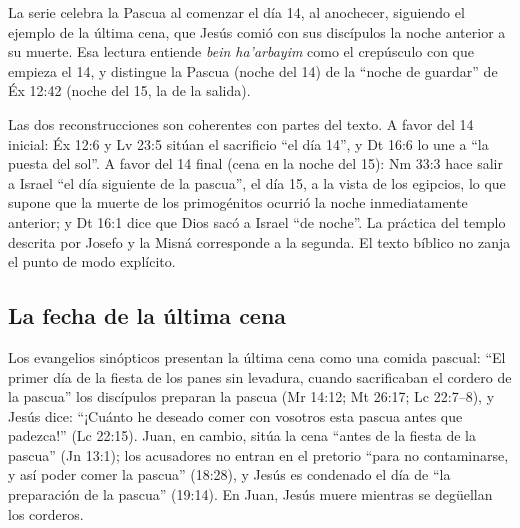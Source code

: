\documentclass[11pt,letterpaper]{article}
\begin{document}
La serie celebra la Pascua al comenzar el día 14, al anochecer, siguiendo el ejemplo de la última cena, que Jesús comió con sus discípulos la noche anterior a su muerte. Esa lectura entiende \emph{bein ha'arbayim} como el crepúsculo con que empieza el 14, y distingue la Pascua (noche del 14) de la ``noche de guardar'' de Éx 12:42 (noche del 15, la de la salida).

\begin{nota}[Precisión]
Las dos reconstrucciones son coherentes con partes del texto. A favor del 14 inicial: Éx 12:6 y Lv 23:5 sitúan el sacrificio ``el día 14'', y Dt 16:6 lo une a ``la puesta del sol''. A favor del 14 final (cena en la noche del 15): Nm 33:3 hace salir a Israel ``el día siguiente de la pascua'', el día 15, a la vista de los egipcios, lo que supone que la muerte de los primogénitos ocurrió la noche inmediatamente anterior; y Dt 16:1 dice que Dios sacó a Israel ``de noche''. La práctica del templo descrita por Josefo y la Misná corresponde a la segunda. El texto bíblico no zanja el punto de modo explícito.
\end{nota}

\subsection{La fecha de la última cena}
Los evangelios sinópticos presentan la última cena como una comida pascual: ``El primer día de la fiesta de los panes sin levadura, cuando sacrificaban el cordero de la pascua'' los discípulos preparan la pascua (Mr 14:12; Mt 26:17; Lc 22:7--8), y Jesús dice: ``¡Cuánto he deseado comer con vosotros esta pascua antes que padezca!'' (Lc 22:15). Juan, en cambio, sitúa la cena ``antes de la fiesta de la pascua'' (Jn 13:1); los acusadores no entran en el pretorio ``para no contaminarse, y así poder comer la pascua'' (18:28), y Jesús es condenado el día de ``la preparación de la pascua'' (19:14). En Juan, Jesús muere mientras se degüellan los corderos.
\end{document}
